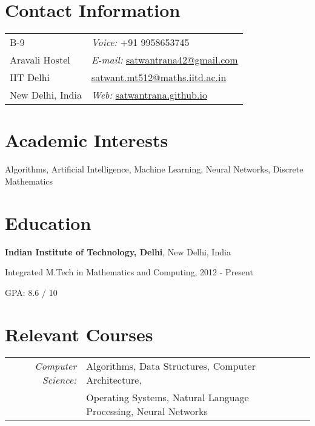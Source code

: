 \documentclass[margin,line]{res}
\newenvironment{list1}{
  \begin{list}{\ding{113}}{%
      \setlength{\itemsep}{0in}
      \setlength{\parsep}{0in} \setlength{\parskip}{0in}
      \setlength{\topsep}{0in} \setlength{\partopsep}{0in} 
      \setlength{\leftmargin}{0.17in}}}{\end{list}}
\begin{document}

\begin{resume}
\section{\sc Contact Information}
\vspace{.05in}
\begin{tabular}{@{}p{2in}p{8in}}
B-9             & {\it Voice:}  +91 9958653745 \\            
Aravali Hostel   & {\it E-mail:}  \href{mailto:satwantrana42@gmail.com}{satwantrana42@gmail.com} \\         
IIT Delhi &  \hspace{11.6 mm} \href{mailto:satwant.mt512@maths.iitd.ac.in}{satwant.mt512@maths.iitd.ac.in}\\   
New Delhi, India  & {\it Web:}  \href{http://satwantrana.github.io}{satwantrana.github.io}\\   
\end{tabular}


\section{\sc Academic Interests}
Algorithms, Artificial Intelligence, Machine Learning, Neural Networks, Discrete Mathematics

\section{\sc Education}
{\bf Indian Institute of Technology, Delhi}, New Delhi, India\\
\vspace*{-.1in}
\begin{list1}
\item[] Integrated M.Tech in Mathematics and Computing,  2012 - Present
\item[] GPA: 8.6 / 10
\end{list1}

\section{\sc Relevant Courses}

\begin{tabular}{rlp{5cm}}

\em{Computer Science:} & Algorithms, Data Structures, Computer Architecture,
\\ & Operating Systems, Natural Language Processing, Neural Networks  \\


\end{tabular}
\end{resume}
\end{document}
